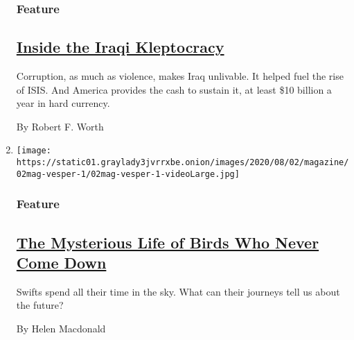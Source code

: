 \begin{enumerate}
  \hypertarget{feature-1}{%
  \subsubsection{Feature}\label{feature-1}}

  \hypertarget{inside-the-iraqi-kleptocracy}{%
  \subsection{\texorpdfstring{\href{/2020/07/29/magazine/iraq-corruption.html}{Inside
  the Iraqi
  Kleptocracy}}{Inside the Iraqi Kleptocracy}}\label{inside-the-iraqi-kleptocracy}}

  Corruption, as much as violence, makes Iraq unlivable. It helped fuel
  the rise of ISIS. And America provides the cash to sustain it, at
  least \$10 billion a year in hard currency.

  By Robert F. Worth
\item
  \texttt{[image: https://static01.graylady3jvrrxbe.onion/images/2020/08/02/magazine/02mag-vesper-1/02mag-vesper-1-videoLarge.jpg]}

  \hypertarget{feature-2}{%
  \subsubsection{Feature}\label{feature-2}}

  \hypertarget{the-mysterious-life-of-birds-who-never-come-down}{%
  \subsection{\texorpdfstring{\href{/2020/07/29/magazine/vesper-flights.html}{The
  Mysterious Life of Birds Who Never Come
  Down}}{The Mysterious Life of Birds Who Never Come Down}}\label{the-mysterious-life-of-birds-who-never-come-down}}

  Swifts spend all their time in the sky. What can their journeys tell
  us about the future?

  By Helen Macdonald
\end{enumerate}

